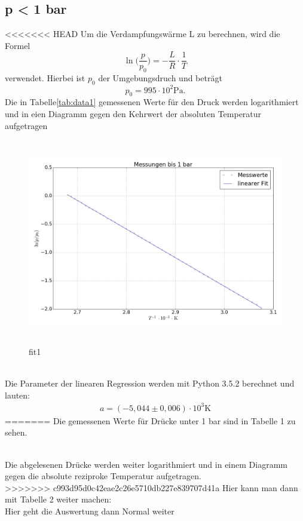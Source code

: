 \subsection{p < 1 bar}
<<<<<<< HEAD
Um die Verdampfungswärme L zu berechnen, wird die Formel
\begin{equation*}
  \ln \bigl(\frac{p}{p_0}\bigr)=-\frac{L}{R} \cdot \frac{1}{T}
\end{equation*}
verwendet. Hierbei ist $p_0$ der Umgebungsdruch und beträgt
\begin{equation*}
  p_0=995\cdot 10^2 \si{\pascal}.
\end{equation*}
Die in Tabelle\ref{tab:data1} gemessenen Werte für den Druck werden logarithmiert und in eien
Diagramm gegen den Kehrwert der absoluten Temperatur aufgetragen \\
 
\begin{figure}
  \centering
  \includegraphics[height=9cm , width=13.5cm]{fit1.jpg}
  \caption{fit1}
  \label{fig:fit1}
  \end{figure}
  \\
Die Parameter der linearen Regression werden mit Python 3.5.2 berechnet und
lauten:
\begin{align*}
  a=(-5,044 \pm 0,006) \cdot 10^3 \si{\kelvin}
\end{align*}
=======
Die gemessenen Werte für Drücke unter 1 bar sind in Tabelle 1 zu sehen.

\\
Die abgelesenen Drücke werden weiter logarithmiert und in einem Diagramm gegen
die absolute reziproke Temperatur aufgetragen. \\
>>>>>>> c993d95d0c42eae2c26e5710db227e839707d41a
\newpage
Hier kann man dann mit Tabelle 2 weiter machen:
 \\
Hier geht die Auswertung dann Normal weiter
